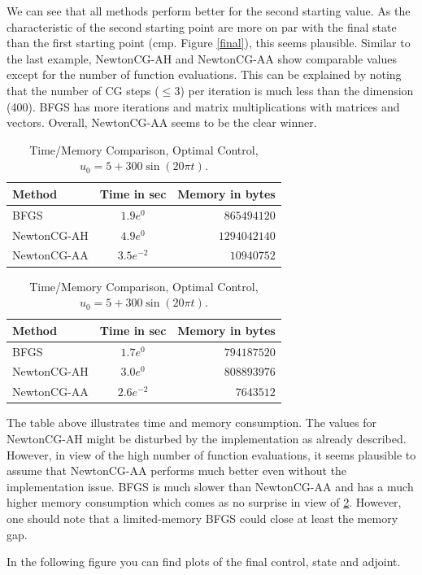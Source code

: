 \documentclass{article}
\begin{document}
We can see that all methods perform better for the second starting value. As the characteristic
of the second starting point are more on par with the final state than the first starting point
(cmp. Figure \ref{final}), this seems plausible. Similar to the last example, NewtonCG-AH and
NewtonCG-AA show comparable values except for the number of function evaluations. This can be 
explained by noting that the number of CG steps ($\leq 3$)  per iteration is much less than the dimension (400). BFGS has more iterations and matrix multiplications with matrices and vectors. Overall,
NewtonCG-AA seems to be the clear winner.
\begin{table}[H]
  \centering
  \begin{tabular}{|l|c|r|}
    \hline
   \textbf{Method} & \textbf{Time} in sec & \textbf{Memory} in bytes \\ \hline
  BFGS &$1.9e^{0}$ &$865494120$  \\ \hline
  NewtonCG-AH&$4.9e^{0}$ &$1294042140$  \\ \hline
  NewtonCG-AA&$3.5e^{-2}$ &$10940752$  \\ \hline
  \end{tabular}
 \caption{Time/Memory Comparison, Optimal Control, $u_{0}=10$}
  \begin{tabular}{|l|c|r|}
    \hline
   \textbf{Method} & \textbf{Time} in sec & \textbf{Memory} in bytes \\ \hline
  BFGS &$1.7e^{0}$ &$794187520$  \\ \hline
  NewtonCG-AH&$3.0e^{0}$ &$808893976$  \\ \hline
  NewtonCG-AA&$2.6e^{-2}$ &$7643512$  \\ \hline
  \end{tabular}
  \label{tab:time3}
\caption{Time/Memory Comparison, Optimal Control, $u_{0}=5 + 300 \sin(20 \pi t).$}

\end{table}
The table above illustrates time and memory consumption. The values for NewtonCG-AH might be
disturbed by the implementation as already described. However, in view of the high number of
function evaluations, it seems plausible to assume that NewtonCG-AA performs much better
even without the implementation issue. BFGS is much slower than NewtonCG-AA and has a much higher
memory consumption which comes as no surprise in view of \ref{tab:time3}. However, one should note
that a limited-memory BFGS could close at least the memory gap.\par
In the following figure you can find plots of the final control, state and adjoint.
\end{document}
